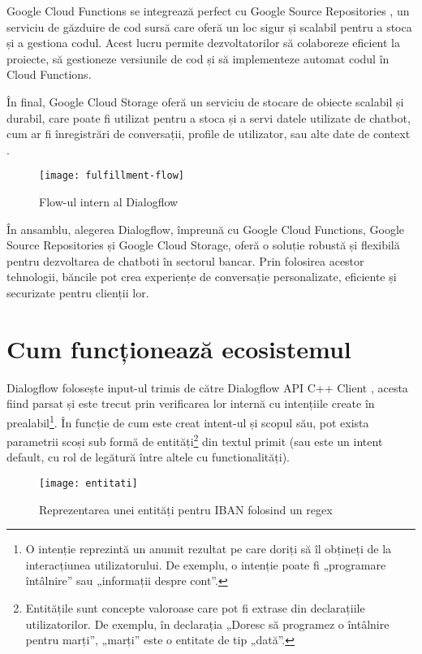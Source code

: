 Google Cloud Functions se integrează perfect cu Google Source Repositories \cite{google_source_repositories}, un serviciu de găzduire de cod sursă care oferă un loc sigur și scalabil pentru a stoca și a gestiona codul. Acest lucru permite dezvoltatorilor să colaboreze eficient la proiecte, să gestioneze versiunile de cod și să implementeze automat codul în Cloud Functions.

În final, Google Cloud Storage oferă un serviciu de stocare de obiecte scalabil și durabil, care poate fi utilizat pentru a stoca și a servi datele utilizate de chatbot, cum ar fi înregistrări de conversații, profile de utilizator, sau alte date de context \cite{google_cloud_storage}.

\begin{figure}[h]
    \centering
    \texttt{[image: fulfillment-flow]}
    \caption{Flow-ul intern al Dialogflow \cite{google_dialogflow}}
\end{figure}

În ansamblu, alegerea Dialogflow, împreună cu Google Cloud Functions, Google Source Repositories și Google Cloud Storage, oferă o soluție robustă și flexibilă pentru dezvoltarea de chatboti în sectorul bancar. Prin folosirea acestor tehnologii, băncile pot crea experiențe de conversație personalizate, eficiente și securizate pentru clienții lor.

\section{Cum funcționează ecosistemul}

Dialogflow folosește input-ul trimis de către Dialogflow API C++ Client \cite{dialogflow_client_library}, acesta fiind parsat și este trecut prin verificarea lor internă cu intențiile create în prealabil\footnote{O intenție reprezintă un anumit rezultat pe care doriți să îl obțineți de la interacțiunea utilizatorului. De exemplu, o intenție poate fi „programare întâlnire” sau „informații despre cont”.}. În funcție de cum este creat intent-ul și scopul său, pot exista parametrii scoși sub formă de entități\footnote{Entitățile sunt concepte valoroase care pot fi extrase din declarațiile utilizatorilor. De exemplu, în declarația „Doresc să programez o întâlnire pentru marți”, „marți” este o entitate de tip „dată”.} din textul primit (sau este un intent default, cu rol de legătură între altele cu functionalități).

\begin{figure}[h]
    \centering
    \texttt{[image: entitati]}
    \caption{Reprezentarea unei entități pentru IBAN folosind un regex}
    \label{fig:entitati}
\end{figure}

